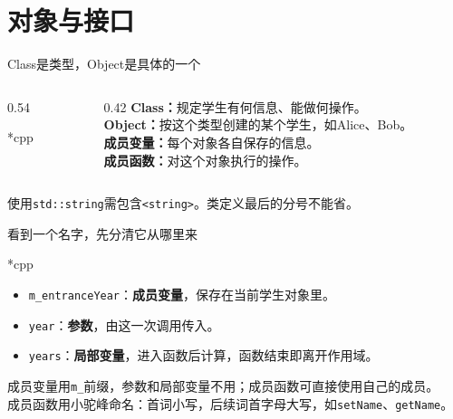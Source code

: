 \section{对象与接口}

\begin{frame}{Class是类型，Object是具体的一个}
    \begin{columns}[T]
        \begin{column}{0.54\textwidth}
            \begin{Code}*{cpp}
                
            \end{Code}
        \end{column}
        \begin{column}{0.42\textwidth}
            \textbf{Class：}规定学生有何信息、能做何操作。\\[8pt]
            \textbf{Object：}按这个类型创建的某个学生，如Alice、Bob。\\[8pt]
            \textbf{成员变量：}每个对象各自保存的信息。\\[8pt]
            \textbf{成员函数：}对这个对象执行的操作。
        \end{column}
    \end{columns}
    \medskip
    \small 使用\texttt{std::string}需包含\texttt{<string>}。类定义最后的分号不能省。
\end{frame}

\begin{frame}{看到一个名字，先分清它从哪里来}
    \begin{Code}*{cpp}
        
    \end{Code}
    \begin{itemize}
        \item \texttt{m\_entranceYear}：\textbf{成员变量}，保存在当前学生对象里。
        \item \texttt{year}：\textbf{参数}，由这一次调用传入。
        \item \texttt{years}：\textbf{局部变量}，进入函数后计算，函数结束即离开作用域。
    \end{itemize}
    \medskip
    \alert{成员变量用\texttt{m\_}前缀，参数和局部变量不用；成员函数可直接使用自己的成员。}\\
    \small 成员函数用小驼峰命名：首词小写，后续词首字母大写，如\texttt{setName}、\texttt{getName}。
\end{frame}

